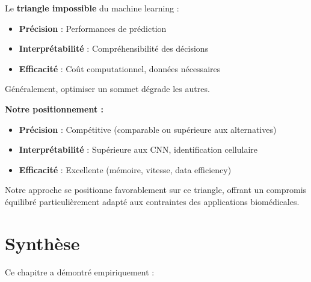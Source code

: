 Le \textbf{triangle impossible} du machine learning :
\begin{itemize}
    \item \textbf{Précision} : Performances de prédiction
    \item \textbf{Interprétabilité} : Compréhensibilité des décisions
    \item \textbf{Efficacité} : Coût computationnel, données nécessaires
\end{itemize}

Généralement, optimiser un sommet dégrade les autres.

\textbf{Notre positionnement :}
\begin{itemize}
    \item \textbf{Précision} : Compétitive (comparable ou supérieure aux alternatives)
    \item \textbf{Interprétabilité} : Supérieure aux CNN, identification cellulaire
    \item \textbf{Efficacité} : Excellente (mémoire, vitesse, data efficiency)
\end{itemize}

Notre approche se positionne favorablement sur ce triangle, offrant un compromis équilibré particulièrement adapté aux contraintes des applications biomédicales.

\section{Synthèse}

Ce chapitre a démontré empiriquement :

